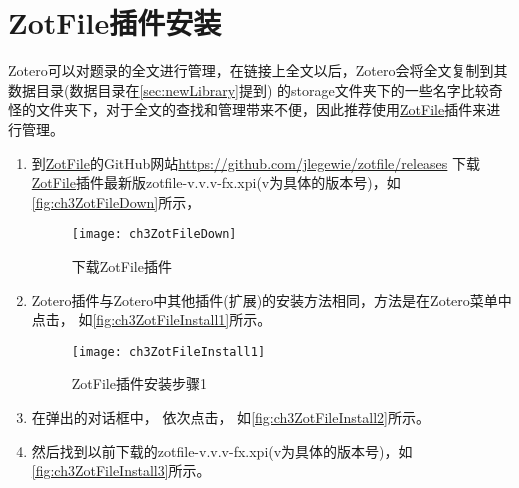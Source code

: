 \documentclass[cn,11pt,chinese]{elegantbook}
\begin{document}
		\section{ ZotFile插件安装}\label{sec:ZotFileInstall}
		Zotero可以对题录的全文进行管理，在链接上全文以后，Zotero会将全文复制到其数据目录(数据目录在\cref{sec:newLibrary}提到)
		的storage文件夹下的一些名字比较奇怪的文件夹下，对于全文的查找和管理带来不便，因此推荐使用\href{http://zotfile.com/}{ZotFile}插件来进行管理。
		\begin{enumerate}
			\item 到\href{http://zotfile.com/}{ZotFile}的GitHub网站\url{https://github.com/jlegewie/zotfile/releases}
			下载\href{http://zotfile.com/}{ZotFile}插件最新版zotfile-v.v.v-fx.xpi(v为具体的版本号)，如\autoref{fig:ch3ZotFileDown}所示，
			\begin{figure}
				\centering
				\texttt{[image: ch3ZotFileDown]}
				\caption{下载ZotFile插件}
				\label{fig:ch3ZotFileDown}
			\end{figure}
			
			\item
			Zotero插件与Zotero中其他插件(扩展)的安装方法相同，方法是在Zotero菜单中点击，
			如\autoref{fig:ch3ZotFileInstall1}所示。
			\begin{figure}[htbp]
				\centering
				\texttt{[image: ch3ZotFileInstall1]}
				\caption{ZotFile插件安装步骤1}
				\label{fig:ch3ZotFileInstall1}
			\end{figure}
			\item
			在弹出的对话框中，
			依次点击，
			如\autoref{fig:ch3ZotFileInstall2}所示。
			\item
			然后找到以前下载的zotfile-v.v.v-fx.xpi(v为具体的版本号)，如\autoref{fig:ch3ZotFileInstall3}所示。
			

\end{enumerate}
\end{document}
